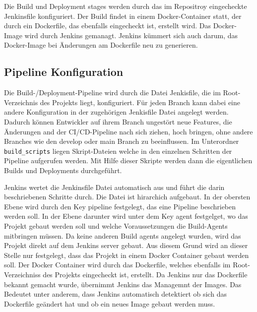 Die Build und Deployment stages werden durch das im Repositroy eingecheckte Jenkinsfile konfiguriert. Der Build findet in einem Docker-Container statt, der durch ein Dockerfile, das ebenfalls eingecheckt ist, erstellt wird. Das Docker-Image wird durch Jenkins gemanagt. Jenkins kümmert sich auch darum, das Docker-Image bei Änderungen am Dockerfile neu zu generieren.

\subsection{Pipeline Konfiguration}

Die Build-/Deployment-Pipeline wird durch die Datei Jenkisfile, die im Root-Verzeichnis des Projekts liegt, konfiguriert. Für jeden Branch kann dabei eine andere Konfiguration in der zugehörigen Jenkisfile Datei angelegt werden. Dadurch können Entwickler auf ihrem Branch ungestört neue Features, die Änderungen and der CI/CD-Pipeline nach sich ziehen, hoch bringen, ohne andere Branches wie den \glqq develop \grqq{} oder \glqq main \grqq{} Branch zu beeinflussen.
Im Unterordner \lstinline{build_scripts} liegen Skript-Dateien welche in den einzelnen Schritten der Pipeline aufgerufen werden. Mit Hilfe dieser Skripte werden dann die eigentlichen Builds und Deployments durchgeführt.

Jenkins wertet die Jenkinsfile Datei automatisch aus und führt die darin beschriebenen Schritte durch. Die Datei ist hirarchich aufgebaut. In der obersten Ebene wird durch den Key \glqq pipeline\grqq{} festgelegt, das eine Pipeline beschrieben werden soll. In der Ebene darunter wird unter dem Key \glqq agent\grqq{} festgelget, wo das Projekt gebaut werden soll und welche Voraussetzungen die Build-Agents mitbringen müssen. Da keine anderen Build agents angelegt wurden, wird das Projekt direkt auf dem Jenkins server gebaut. Aus diesem Grund wird an dieser Stelle nur festgelegt, dass das Projekt in einem Docker Container gebaut werden soll. Der Docker Container wird durch das Dockerfile, welches ebenfalls im Root-Verzeichniss des Projekts eingecheckt ist, erstellt. Da Jenkins nur das Dockerfile bekannt gemacht wurde, übernimmt Jenkins das Managemnt der Images. Das Bedeutet unter anderem, dass Jenkins automatisch detektiert ob sich das Dockerfile geändert hat und ob ein neues Image gebaut werden muss.


